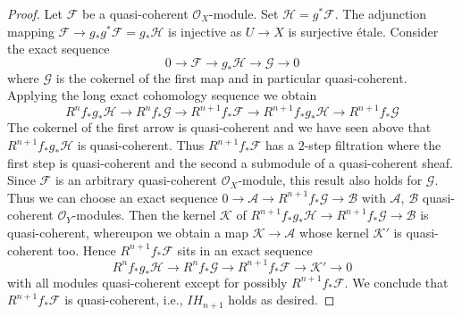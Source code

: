 \documentclass[10pt,a4paper]{amsart}
\theoremstyle{plain}
\theoremstyle{definition}
\theoremstyle{remark}
\numberwithin{equation}{subsection}
\begin{document}
\begin{proof}
\medskip\noindent
Let $\mathcal{F}$ be a quasi-coherent $\mathcal{O}_X$-module.
Set $\mathcal{H} = g^*\mathcal{F}$. The adjunction mapping
$\mathcal{F} \to g_*g^*\mathcal{F} = g_*\mathcal{H}$ is injective
as $U \to X$ is surjective \'etale. Consider the exact sequence
$$
0 \to \mathcal{F} \to g_*\mathcal{H} \to \mathcal{G} \to 0
$$
where $\mathcal{G}$ is the cokernel of the first map and in particular
quasi-coherent. Applying the long exact cohomology sequence we obtain
$$
R^nf_*g_*\mathcal{H} \to
R^nf_*\mathcal{G} \to
R^{n + 1}f_*\mathcal{F} \to
R^{n + 1}f_*g_*\mathcal{H} \to
R^{n + 1}f_*\mathcal{G}
$$
The cokernel of the first arrow is quasi-coherent and
we have seen above that $R^{n + 1}f_*g_*\mathcal{H}$ is quasi-coherent.
Thus $R^{n + 1}f_*\mathcal{F}$ has a $2$-step filtration
where the first step is quasi-coherent and the second a submodule of
a quasi-coherent sheaf. Since $\mathcal{F}$ is an arbitrary quasi-coherent
$\mathcal{O}_X$-module, this result also holds for $\mathcal{G}$.
Thus we can choose an exact sequence
$0 \to \mathcal{A} \to R^{n + 1}f_*\mathcal{G} \to \mathcal{B}$
with $\mathcal{A}$, $\mathcal{B}$ quasi-coherent $\mathcal{O}_Y$-modules.
Then the kernel $\mathcal{K}$ of
$R^{n + 1}f_*g_*\mathcal{H} \to R^{n + 1}f_*\mathcal{G}
\to \mathcal{B}$ is quasi-coherent, whereupon we obtain a map
$\mathcal{K} \to \mathcal{A}$ whose kernel $\mathcal{K}'$ is
quasi-coherent too. Hence $R^{n + 1}f_*\mathcal{F}$ sits in an exact
sequence
$$
R^nf_*g_*\mathcal{H} \to
R^nf_*\mathcal{G} \to
R^{n + 1}f_*\mathcal{F} \to \mathcal{K}' \to 0
$$
with all modules quasi-coherent except for possibly $R^{n + 1}f_*\mathcal{F}$.
We conclude that $R^{n + 1}f_*\mathcal{F}$ is quasi-coherent, i.e.,
$IH_{n + 1}$ holds as desired.
\end{proof}
\end{document}
